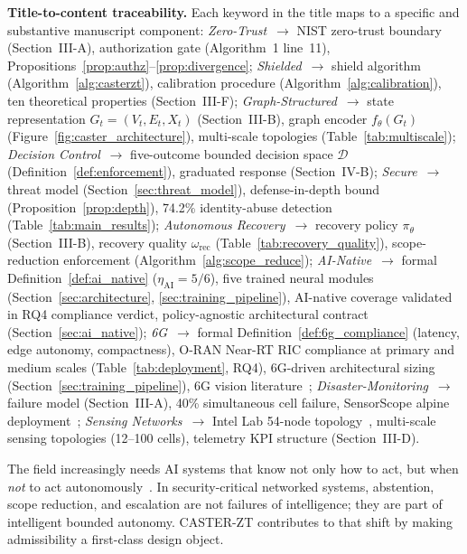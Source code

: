 \documentclass[10pt,journal,compsoc]{IEEEtran}
\begin{document}
\noindent\textbf{Title-to-content traceability.}
Each keyword in the title maps to a specific and substantive manuscript component:
\emph{Zero-Trust}~$\to$ NIST zero-trust boundary (Section~III-A), authorization gate (Algorithm~1 line~11), Propositions~\ref{prop:authz}--\ref{prop:divergence};
\emph{Shielded}~$\to$ shield algorithm (Algorithm~\ref{alg:casterzt}), calibration procedure (Algorithm~\ref{alg:calibration}), ten theoretical properties (Section~III-F);
\emph{Graph-Structured}~$\to$ state representation $G_t=(V_t,E_t,X_t)$ (Section~III-B), graph encoder $f_\theta(G_t)$ (Figure~\ref{fig:caster_architecture}), multi-scale topologies (Table~\ref{tab:multiscale});
\emph{Decision Control}~$\to$ five-outcome bounded decision space $\mathcal{D}$ (Definition~\ref{def:enforcement}), graduated response (Section~IV-B);
\emph{Secure}~$\to$ threat model (Section~\ref{sec:threat_model}), defense-in-depth bound (Proposition~\ref{prop:depth}), 74.2\% identity-abuse detection (Table~\ref{tab:main_results});
\emph{Autonomous Recovery}~$\to$ recovery policy $\pi_\theta$ (Section~III-B), recovery quality $\omega_{\mathrm{rec}}$ (Table~\ref{tab:recovery_quality}), scope-reduction enforcement (Algorithm~\ref{alg:scope_reduce});
\emph{AI-Native}~$\to$ formal Definition~\ref{def:ai_native} ($\eta_{\mathrm{AI}} = 5/6$), five trained neural modules (Section~\ref{sec:architecture}, \ref{sec:training_pipeline}), AI-native coverage validated in RQ4 compliance verdict, policy-agnostic architectural contract (Section~\ref{sec:ai_native});
\emph{6G}~$\to$ formal Definition~\ref{def:6g_compliance} (latency, edge autonomy, compactness), O-RAN Near-RT RIC compliance at primary and medium scales (Table~\ref{tab:deployment}, RQ4), 6G-driven architectural sizing (Section~\ref{sec:training_pipeline}), 6G vision literature~\cite{saad2020vision6g,letaief2019roadmap6g,oran_official_architecture};
\emph{Disaster-Monitoring}~$\to$ failure model (Section~III-A), 40\% simultaneous cell failure, SensorScope alpine deployment~\cite{sensorscope2008};
\emph{Sensing Networks}~$\to$ Intel Lab 54-node topology~\cite{intel_lab_data_2004}, multi-scale sensing topologies (12--100 cells), telemetry KPI structure (Section~III-D).

The field increasingly needs AI systems that know not only how to act, but when \emph{not} to act autonomously~\cite{amodei2016concrete}.
In security-critical networked systems, abstention, scope reduction, and escalation are not failures of intelligence; they are part of intelligent bounded autonomy.
CASTER-ZT contributes to that shift by making admissibility a first-class design object.
\end{document}
